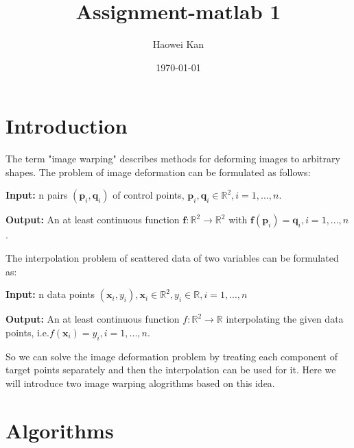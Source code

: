\documentclass{article}
\begin{document}
\title {Assignment-matlab 1}
\date{\today}
\author{Haowei Kan}
\maketitle
\section{Introduction}
The term "image warping" describes methods for deforming images to arbitrary shapes. The problem of image deformation can be formulated as follows:

{\bf Input:} n pairs $(\mathbf{p}_i,\mathbf{q}_i) $ of control points, $\mathbf{p}_i,\mathbf{q}_i\in \mathbb{R}^2, i = 1,...,n $.

{\bf Output:} An at least continuous function $\mathbf{f}:\mathbb{R}^2\rightarrow\mathbb{R}^2$ with $\mathbf{f}(\mathbf{p}_i)=\mathbf{q}_i,i = 1,...,n$.

\noindent The interpolation problem of scattered data of two variables can be formulated as:

{\bf Input:} n data points $(\mathbf{x}_i,y_i),\mathbf{x}_i\in\mathbb{R}^2,y_i\in\mathbb{R},i=1,...,n$

{\bf Output:} An at least continuous function $f:\mathbb{R}^2\rightarrow\mathbb{R}$ interpolating the given data points, i.e.$f(\mathbf{x}_i)=y_i, i=1,...,n$.

\noindent So we can solve the image deformation problem by treating each component of target points separately and then the interpolation can be used for it. Here we will introduce two image warping alogrithms based on this idea.


\section{Algorithms}
\end{document}
